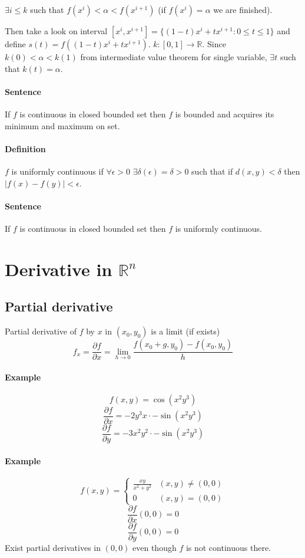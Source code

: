 $\exists i\leq k$ such that $f(x^i) < \alpha < f(x^{i+1})$ (if $f(x^i) = \alpha$ we are finished).

Then take a look on interval $[x^i, x^{i+1}] = \big\{ (1-t)x^i +tx^{i+1} : 0\leq t\leq 1\big\}$
and define $s(t) = f((1-t)x^i +tx^{i+1} )$. $k: [0,1] \to \mathbb{R}$. Since $k(0)< \alpha < k(1)$ from intermediate value theorem for single variable, $\exists t$ such that $k(t) = \alpha$.
\paragraph{Sentence}
If $f$ is continuous in closed bounded set then $f$ is bounded and acquires its minimum and maximum on set.
\paragraph{Definition}
$f$ is uniformly continuous if $\forall \epsilon > 0 $ $\exists \delta(\epsilon) = \delta > 0$ such that if $d(x,y) < \delta$ then $\left|f(x)-f(y)\right| < \epsilon$.
\paragraph{Sentence}
If $f$ is continuous in closed bounded set then $f$ is  uniformly continuous.

\section{Derivative in $\mathbb{R}^n$}
\subsection{Partial derivative}
Partial derivative of $f$ by $x$ in $(x_0,y_0)$ is a limit (if exists)
$$f_x = \frac{\partial f}{\partial x} = \lim_{h \to 0} \frac{f(x_0+g, y_0)-f(x_0,y_0)}{h}$$
\paragraph{Example}
$$f(x,y) = \cos (x^2y^3)$$
$$\frac{\partial f}{\partial x} = -2y^3x \cdot -\sin(x^2y^3)$$
$$\frac{\partial f}{\partial y} = -3x^2y^2 \cdot -\sin(x^2y^3)$$
\paragraph{Example}
$$f(x,y)  =\begin{cases}\frac{xy}{x^2+y^2}& (x,y)\neq (0,0)\\0&(x,y)=(0,0)
\end{cases}$$
$$\frac{\partial f}{\partial x} (0,0) = 0$$
$$\frac{\partial f}{\partial y} (0,0) = 0$$
Exist partial derivatives in $(0,0)$ even though $f$ is not continuous there.
